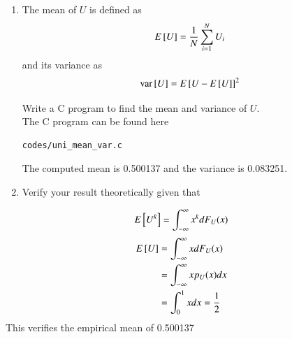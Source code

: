 \documentclass[journal,12pt,twocolumn]{IEEEtran}
\renewcommand\thesection{\arabic{section}}
\begin{document}
\begin{enumerate}[label=\thesection.\arabic*
,ref=\thesection.\theenumi]
\solution
The CDF of $U$ is given by
		\begin{align}
			F_U(x) = \pr{U \leq x} = \int_{-\infty}^{x}p_U(u)du
		\end{align}
There are three cases:
		\begin{enumerate}
			\item $x < 0$ : \\ $p_X(x) = 0$, and hence $F_U(x) = 0$.\\
			\item $0 \leq x \leq 1$ : \\ 
				\begin{equation}
					F_U(x) = \int_{0}^{x}du = x
				\end{equation}
			\item $x > 1$: \\ \[F_U(x) = \int_{0}^{1}du = 1\]
		\end{enumerate}
Therefore,
		\begin{align}
			F_U(x) = 
			\begin{cases}
				0 & x < 0 \\
				x & 0 \leq x \leq 1 \\
				1 & x > 1
			\end{cases}
		\end{align}\\
\item
The mean of $U$ is defined as
%
\begin{equation}
E{}\left[U\right] = \frac{1}{N}\sum_{i=1}^{N}U_i
\end{equation}
%
and its variance as
%
\begin{equation}
\text{var}{}\left[U\right] = E{}\left[U- E{}\left[U\right]\right]^2 
\end{equation}

Write a C program to  find the mean and variance of $U$.\\

\solution
The C program can be found here
\begin{lstlisting}
codes/uni_mean_var.c
\end{lstlisting}

The computed mean is 0.500137 and the variance is 0.083251.\\

\item Verify your result theoretically given that
\end{enumerate}
%
\begin{equation}
E{}\left[U^k\right] = \int_{-\infty}^{\infty}x^kdF_{U}(x)
\end{equation}
\solution
\begin{align}
	E{}\left[U\right] &= \int_{-\infty}^{\infty}xdF_U(x) \\
	&= \int_{-\infty}^{\infty}xp_U(x)dx \\
	&= \int_{0}^{1}xdx = \frac{1}{2}
\end{align}
This verifies the empirical mean of 0.500137\\
\end{document}

